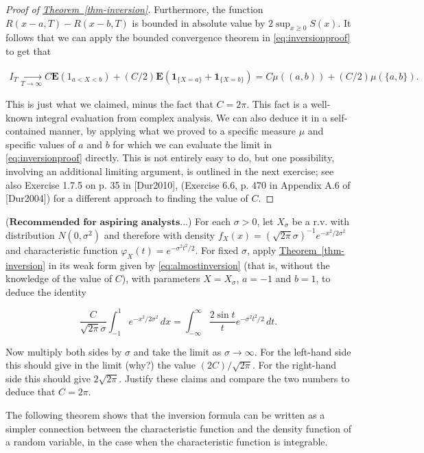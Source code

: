 \begin{proof}[Proof of \texorpdfstring{\hyperref[thm-inversion]{Theorem~\ref*{thm-inversion}}}{Theorem}]
\noindent Furthermore, the function $R(x-a,T)-R(x-b,T)$ is
bounded in absolute value by $2\sup_{x\ge 0} S(x)$.
It follows that we can apply the bounded convergence
theorem in \eqref{eq:inversionproof} to get that

\begin{align*}
\tag{13}\label{eq:almostinversion}
I_T \xrightarrow[T\to\infty]{} C \mathbf{E}(1_{a<X<b}) + (C/2) \mathbf{E}(\mathbf{1}_{\{X=a\}} + \mathbf{1}_{\{X=b\}}) = C \mu((a,b)) + (C/2)\mu(\{a,b\}).
\end{align*}

\noindent This is just what we claimed, minus the fact that
$C=2\pi$. This fact is a well-known integral
evaluation from complex analysis. We can also deduce
it in a self-contained manner, by applying what we
proved to a specific measure $\mu$ and specific
values of $a$ and $b$ for which we can evaluate the
limit in \eqref{eq:inversionproof} directly. This is not
entirely easy to do, but one possibility, involving an
additional limiting argument, is outlined in the next
exercise; see also Exercise 1.7.5 on p. 35 in
[Dur2010], (Exercise 6.6, p. 470 in Appendix A.6 of
[Dur2004]) for a different approach to finding the
value of $C$.
\end{proof}

\begin{xexercise}
($\textbf{Recommended for aspiring analysts}$...) For
each $\sigma>0$, let $X_\sigma$ be a r.v. with
distribution $N(0,\sigma^2)$ and therefore with
density
$f_X(x)=(\sqrt{2\pi}\sigma)^{-1} e^{-x^2/2\sigma^2}$
and characteristic function
$\varphi_X(t) = e^{-\sigma^2 t^2/2}$. For fixed
$\sigma$, apply \hyperref[thm-inversion]{Theorem~\ref*{thm-inversion}} in its weak
form given by \eqref{eq:almostinversion} (that is, without
the knowledge of the value of $C$), with parameters
$X=X_\sigma$, $a=-1$ and $b=1$,  to deduce the
identity

\[
\frac{C}{\sqrt{2\pi}\sigma} \int_{-1}^1 e^{-x^2/2\sigma^2}\,dx = \int_{-\infty}^\infty \frac{2\sin t}{t} e^{-\sigma^2 t^2/2}\,dt.
\]

\noindent Now multiply both sides by $\sigma$ and take the
limit as $\sigma\to\infty$. For the left-hand side
this should give in the limit (why?) the value
$(2C)/\sqrt{2\pi}$. For the right-hand side this
should give $2\sqrt{2\pi}$. Justify these claims and
compare the two numbers to deduce that $C=2\pi$.
\end{xexercise}

\noindent The following theorem shows that the inversion
formula can be written as a simpler connection between
the characteristic function and the density function
of a random variable, in the case when the
characteristic function is integrable.


